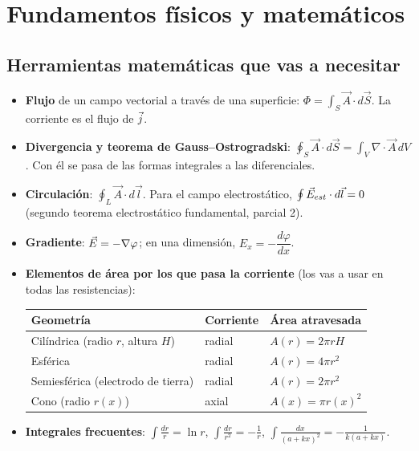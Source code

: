 \documentclass[11pt]{article}
\begin{document}
\section{Fundamentos físicos y matemáticos}

\subsection{Herramientas matemáticas que vas a necesitar}
\begin{itemize}
\item \textbf{Flujo} de un campo vectorial a través de una superficie: $\Phi=\int_S \vec A\cdot d\vec S$. La corriente es el flujo de $\vec{j}$.
\item \textbf{Divergencia y teorema de Gauss--Ostrogradski}: $\oint_S \vec A\cdot d\vec S=\int_V \nabla\cdot\vec A\,dV$. Con él se pasa de las formas integrales a las diferenciales.
\item \textbf{Circulación}: $\oint_L \vec A\cdot d\vec l$. Para el campo electrostático, $\oint\vec{E}_{est}\cdot d\vec l=0$ (segundo teorema electrostático fundamental, parcial 2).
\item \textbf{Gradiente}: $\vec{E}=-\nabla\varphi$; en una dimensión, $E_x=-\dfrac{d\varphi}{dx}$.
\item \textbf{Elementos de área por los que pasa la corriente} (los vas a usar en todas las resistencias):
\begin{center}
\begin{tabular}{lll}
\toprule
Geometría & Corriente & Área atravesada\\
\midrule
Cilíndrica (radio $r$, altura $H$) & radial & $A(r)=2\pi r H$\\
Esférica & radial & $A(r)=4\pi r^2$\\
Semiesférica (electrodo de tierra) & radial & $A(r)=2\pi r^2$\\
Cono (radio $r(x)$) & axial & $A(x)=\pi r(x)^2$\\
\bottomrule
\end{tabular}
\end{center}
\item \textbf{Integrales frecuentes}: $\int\frac{dr}{r}=\ln r$, $\int\frac{dr}{r^2}=-\frac1r$, $\int\frac{dx}{(a+kx)^2}=-\frac{1}{k(a+kx)}$.
\end{itemize}

\end{document}
